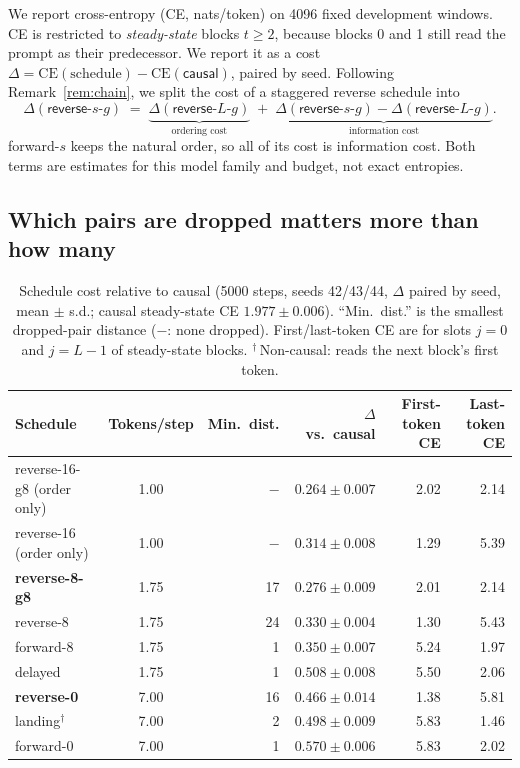 \documentclass[11pt]{article}
\theoremstyle{definition}
\theoremstyle{remark}
\newcommand{\sch}[1]{\textsf{#1}}
\begin{document}
We report cross-entropy (CE, nats/token) on 4096 fixed development windows.
CE is restricted to \emph{steady-state} blocks $t\ge2$, because blocks 0 and 1 still read the prompt as their predecessor.
We report it as a cost $\Delta=\text{CE}(\text{schedule})-\text{CE}(\sch{causal})$, paired by seed.
Following Remark~\ref{rem:chain}, we split the cost of a staggered reverse schedule into
\begin{equation}
  \Delta(\sch{reverse-$s$-$g$}) \;=\; \underbrace{\Delta(\sch{reverse-$L$-$g$})}_{\text{ordering cost}} \;+\; \underbrace{\Delta(\sch{reverse-$s$-$g$})-\Delta(\sch{reverse-$L$-$g$})}_{\text{information cost}} .
  \label{eq:decomp}
\end{equation}
\sch{forward-$s$} keeps the natural order, so all of its cost is information cost.
Both terms are estimates for this model family and budget, not exact entropies.

\subsection{Which pairs are dropped matters more than how many}

\begin{table}[t]
  \centering
  \caption{Schedule cost relative to \sch{causal} (5000 steps, seeds 42/43/44, $\Delta$ paired by seed, mean $\pm$ s.d.; causal steady-state CE $1.977\pm0.006$). ``Min.\ dist.'' is the smallest dropped-pair distance ($-$: none dropped). First/last-token CE are for slots $j=0$ and $j=L-1$ of steady-state blocks. $^\dagger$\,Non-causal: reads the next block's first token.}
  \label{tab:main}
  \small
  \begin{tabular}{lcrrrr}
    \toprule
    Schedule & Tokens/step & Min.\ dist. & $\Delta$ vs.\ causal & First-token CE & Last-token CE \\
    \midrule
    \sch{reverse-16-g8} (order only) & 1.00 & $-$ & $0.264\pm0.007$ & 2.02 & 2.14 \\
    \sch{reverse-16} (order only)    & 1.00 & $-$ & $0.314\pm0.008$ & 1.29 & 5.39 \\
    \midrule
    \textbf{\sch{reverse-8-g8}}      & 1.75 & 17 & $\mathbf{0.276\pm0.009}$ & 2.01 & 2.14 \\
    \sch{reverse-8}                  & 1.75 & 24 & $0.330\pm0.004$ & 1.30 & 5.43 \\
    \sch{forward-8}                  & 1.75 & 1  & $0.350\pm0.007$ & 5.24 & 1.97 \\
    \sch{delayed}                    & 1.75 & 1  & $0.508\pm0.008$ & 5.50 & 2.06 \\
    \midrule
    \textbf{\sch{reverse-0}}         & 7.00 & 16 & $\mathbf{0.466\pm0.014}$ & 1.38 & 5.81 \\
    \sch{landing}$^\dagger$          & 7.00 & 2  & $0.498\pm0.009$ & 5.83 & 1.46 \\
    \sch{forward-0}                  & 7.00 & 1  & $0.570\pm0.006$ & 5.83 & 2.02 \\
    \bottomrule
  \end{tabular}
\end{table}
\end{document}
